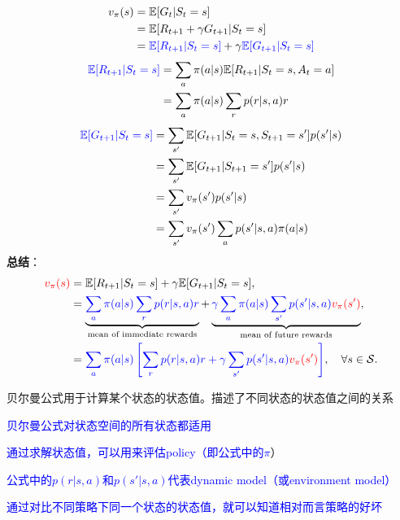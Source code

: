 \documentclass{article}
\begin{document}
\begin{align*}
v_{\pi}(s) &= \mathbb{E}[G_t | S_t = s] \\
&= \mathbb{E}[R_{t+1} + \gamma G_{t+1} | S_t = s] \\
&= \textcolor{blue}{\mathbb{E}[R_{t+1} | S_t = s]} + \gamma \textcolor{blue}{\mathbb{E}[G_{t+1} | S_t = s]}
\end{align*}
\begin{align*}
\textcolor{blue}{\mathbb{E}[R_{t+1} | S_t = s]} &= \sum_{a} \pi(a|s) \mathbb{E}[R_{t+1} | S_t = s, A_t = a] \\
&= \sum_{a} \pi(a|s) \sum_{r} p(r|s, a)r
\end{align*}
\begin{align*}
\textcolor{blue}{\mathbb{E}[G_{t+1} | S_t = s]} &= \sum_{s'} \mathbb{E}[G_{t+1} | S_t = s, S_{t+1} = s'] p(s'|s) \\
&= \sum_{s'} \mathbb{E}[G_{t+1} | S_{t+1} = s'] p(s'|s) \\
&= \sum_{s'} v_{\pi}(s') p(s'|s) \\
&= \sum_{s'} v_{\pi}(s') \sum_{a} p(s'|s, a) \pi(a|s)
\end{align*}
\textbf{总结}：
\begin{align*}
\textcolor{red}{v_{\pi}(s)} &= \mathbb{E}[R_{t+1} | S_t = s] + \gamma \mathbb{E}[G_{t+1} | S_t = s], \\
&= \underbrace{\textcolor{blue}{\sum_{a} \pi(a|s) \sum_{r} p(r|s, a)r}}_{\text{mean of immediate rewards}} + \underbrace{\textcolor{blue}{\gamma \sum_{a} \pi(a|s) \sum_{s'} p(s'|s, a) \textcolor{red}{v_{\pi}(s')}}}_{\text{mean of future rewards}}, \\
&= \textcolor{blue}{\sum_{a} \pi(a|s) \left[ \sum_{r} p(r|s, a)r + \gamma \sum_{s'} p(s'|s, a) \textcolor{red}{v_{\pi}(s')} \right]}, \quad \forall s \in \mathcal{S}.
\end{align*}

贝尔曼公式用于计算某个状态的状态值。描述了不同状态的状态值之间的关系

\textcolor{blue}{\kaishu*贝尔曼公式对状态空间的所有状态都适用}

\textcolor{blue}{\kaishu*通过求解状态值，可以用来评估policy（即公式中的$\pi$}）

\textcolor{blue}{\kaishu*公式中的$p(r|s, a)$和$p(s'|s, a)$代表dynamic model（或environment model）}

\textcolor{blue}{\kaishu*通过对比不同策略下同一个状态的状态值，就可以知道相对而言策略的好坏}
\end{document}

